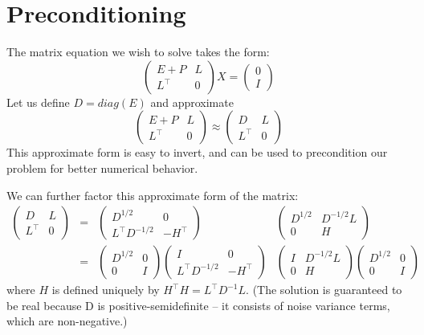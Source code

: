 \section{Preconditioning}

The matrix equation we wish to solve takes the form:
\[\begin{pmatrix}
E+P & L\\
L^\top & 0
\end{pmatrix}
X = 
\begin{pmatrix}
0 \\ I
\end{pmatrix}\]
Let us define $D = diag(E)$ and approximate
\[\begin{pmatrix}
E+P & L\\
L^\top & 0
\end{pmatrix}
\approx
\begin{pmatrix}
D & L\\
L^\top & 0
\end{pmatrix}\]
This approximate form is easy to invert, and can be used to precondition our problem for better numerical behavior.

We can further factor this approximate form of the matrix:
\[
\begin{array}{cccc}
\begin{pmatrix}
D & L\\
L^\top & 0
\end{pmatrix}
&=&
\begin{pmatrix}
D^{1/2} & 0\\
L^\top D^{-1/2} & -H^\top
\end{pmatrix}
&
\begin{pmatrix}
D^{1/2} & D^{-1/2}L\\
0 & H
\end{pmatrix}\\[1em]
&=&

\begin{pmatrix}
D^{1/2} & 0\\
0 & I
\end{pmatrix}
\begin{pmatrix}
I & 0\\
L^\top D^{-1/2} & -H^\top
\end{pmatrix}
&
\begin{pmatrix}
I & D^{-1/2}L\\
0 & H
\end{pmatrix}
\begin{pmatrix}
D^{1/2} & 0\\
0 & I
\end{pmatrix}

\end{array}
\]
where $H$ is defined uniquely by $H^\top H = L^\top D^{-1} L$.  (The solution is guaranteed to be real because D is positive-semidefinite -- it consists of noise variance terms, which are non-negative.)


